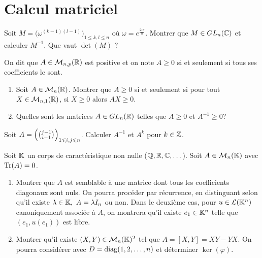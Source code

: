 \section{Calcul matriciel}

\begin{exercise}
	Soit $M=\bigl(\omega^{(k-1)(l-1)}\bigr)_{1\leqslant k,l\leqslant n}$ où
	$\omega=e^{\frac{2\mathrm{i}\pi}{n}}$. Montrer que $M\in GL_{n}(\mathbb{C})$ et
	calculer $M^{-1}$. Que vaut $\det(M)$ ?
\end{exercise}

\begin{exercise}
	On dit que $A\in\mathcal{M}_{n,p}(\mathbb{R})$ est positive et on note $A\geqslant0$ si et
	seulement si tous ses coefficients le sont.
	\begin{enumerate}
		\item
		Soit $A\in\mathcal{M}_{n}(\mathbb{R})$. Montrer que $A\geqslant0$ si et seulement si pour
		tout $X\in\mathcal{M}_{n,1}(\mathbb{R})$, si $X\geqslant0$ alors $AX\geqslant0$.
		\item
		Quelles sont les matrices $A\in GL_{n}(\mathbb{R})$ telles que $A\geqslant0$ et
		$A^{-1}\geqslant0$?
	\end{enumerate}
\end{exercise}

\begin{exercise}
	Soit $A=\Bigl(\binom{j-1}{i-1}\Bigr)_{1\leqslant i,j\leqslant n}$. Calculer
	$A^{-1}$ et $A^{k}$ pour $k\in\mathbb{Z}$.
\end{exercise}

\begin{exercise}
	Soit $\mathbb{K}$ un corps de caractéristique non nulle ($\mathbb{Q},\mathbb{R},\mathbb{C},\dots$). Soit
	$A\in\mathcal{M}_{n}(\mathbb{K})$ avec $\operatorname{Tr}(A)=0$.
	\begin{enumerate}
		\item
		Montrer que $A$ est semblable à une matrice dont tous les coefficients
		diagonaux sont nuls. On pourra procéder par récurrence, en distinguant
		selon qu'il existe $\lambda\in\mathbb{K},~A=\lambda I_{n}$ ou non. Dans le
		deuxième cas, pour $u\in\mathcal{L}(\mathbb{K}^{n})$ canoniquement associée à $A$, on
		montrera qu'il existe $e_{1}\in\mathbb{K}^{n}$ telle que $(e_{1},u(e_{1}))$ est
		libre.
		\item
		Montrer qu'il existe $(X,Y)\in\mathcal{M}_{n}(\mathbb{K})^{2}$ tel que $A=[X,Y]=XY-YX$. On
		pourra considérer 
		avec $D=\operatorname{diag}(1,2,\dots,n)$ et déterminer $\ker(\varphi)$.
	\end{enumerate}
\end{exercise}

